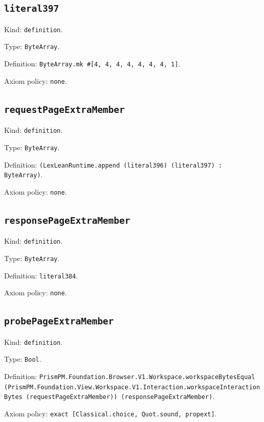 \documentclass[11pt]{article}
\begin{document}
\subsection*{\texttt{literal397}}
\noindent Kind: \texttt{definition}.\par
\noindent Type: \texttt{ByteArray}.\par
\noindent Definition: \texttt{ByteArray.mk \#[4, 4, 4, 4, 4, 4, 4, 1]}.\par
\noindent Axiom policy: \texttt{none}.\par
\subsection*{\texttt{requestPageExtraMember}}
\noindent Kind: \texttt{definition}.\par
\noindent Type: \texttt{ByteArray}.\par
\noindent Definition: \texttt{(LexLeanRuntime.append (literal396) (literal397) : ByteArray)}.\par
\noindent Axiom policy: \texttt{none}.\par
\subsection*{\texttt{responsePageExtraMember}}
\noindent Kind: \texttt{definition}.\par
\noindent Type: \texttt{ByteArray}.\par
\noindent Definition: \texttt{literal384}.\par
\noindent Axiom policy: \texttt{none}.\par
\subsection*{\texttt{probePageExtraMember}}
\noindent Kind: \texttt{definition}.\par
\noindent Type: \texttt{Bool}.\par
\noindent Definition: \texttt{PrismPM.Foundation.Browser.V1.Workspace.workspaceBytesEqual (PrismPM.Foundation.View.Workspace.V1.Interaction.workspaceInteractionBytes (requestPageExtraMember)) (responsePageExtraMember)}.\par
\noindent Axiom policy: \texttt{exact [Classical.choice, Quot.sound, propext]}.\par
\end{document}
